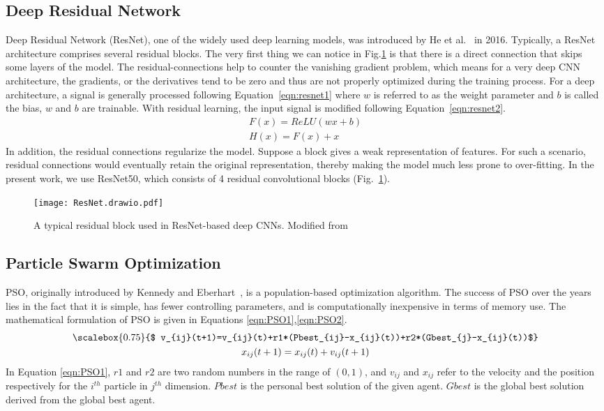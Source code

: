 \documentclass[final,3p,times]{elsarticle}
\newcommand*{\Scale}[2][4]{\scalebox{#1}{$#2$}}\usepackage{multirow}
\begin{document}
\subsection{Deep Residual Network}
Deep Residual Network (ResNet), one of the widely used deep learning {models,} was introduced by He et al.~\cite{he2016deep} in 2016. {Typically,} a ResNet architecture {comprises} several residual blocks. The very first thing we can notice in Fig.\ref{fig:resnet} is that there is a direct connection that skips some layers of the model. The {residual-connections} help to counter the vanishing gradient {problem,} which means {for a} very deep CNN architecture, the gradients, or the derivatives tend to be zero and thus are not properly optimized during the training process. For a deep architecture, a signal is generally processed {following} Equation~\ref{eqn:resnet1} where $w$ is referred to as the weight parameter and $b$ is called the {bias,} $w$ and $b$ are trainable. {With} residual learning, the input signal is modified following Equation~\ref{eqn:resnet2}.
\begin{gather}
    \label{eqn:resnet1}
    F(x)=ReLU(wx + b)\\
    \label{eqn:resnet2}
    H(x)=F(x)+x
\end{gather}
In addition, the residual connections regularize the model. Suppose a block gives a weak representation of features. For such a scenario, residual connections would eventually retain the original representation, thereby making the model much {less} prone to over-fitting. In {the present} work, we use {ResNet50,} which consists of 4 {residual} convolutional blocks (Fig.~\ref{fig:resnet}).
\begin{figure}[ht!]
    \centering
    \texttt{[image: ResNet.drawio.pdf]}
    \caption{A typical residual block used in ResNet-based deep CNNs. Modified from \cite{he2016deep}}
    \label{fig:resnet}
\end{figure}
\subsection{Particle Swarm Optimization}
PSO, originally introduced by Kennedy and Eberhart~\cite{kennedy1995particle}, is a {population-based} optimization algorithm. The success of PSO over the years lies in the fact that it is simple, {has fewer} controlling {parameters,} and is computationally inexpensive in terms of memory use. The mathematical formulation of PSO is given in Equations \ref{eqn:PSO1},\ref{eqn:PSO2}.
\begin{gather}
    \label{eqn:PSO1}
    \Scale[0.75]{
    v_{ij}(t+1)=v_{ij}(t)+r1*(Pbest_{ij}-x_{ij}(t))+r2*(Gbest_{j}-x_{ij}(t))}\\
    \label{eqn:PSO2}
    x_{ij}(t+1)=x_{ij}(t) + v_{ij}(t+1)
\end{gather}
In Equation \ref{eqn:PSO1}, $r1$ and $r2$ are two random numbers in the range of $(0,1)$, and $v_{ij}$ and $x_{ij}$ refer to the velocity and the position respectively for the $i^{th}$ particle in $j^{th}$ dimension. $Pbest$ is the personal best solution of the given agent. $Gbest$ is the global best solution derived from the global best agent.
\end{document}
